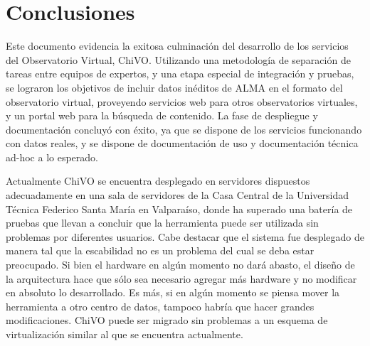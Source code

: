 \section{Conclusiones}

Este documento evidencia la exitosa culminación del desarrollo de los servicios del Observatorio Virtual, ChiVO. Utilizando una metodología de separación de tareas entre equipos de expertos, y una etapa especial de integración y pruebas, se lograron los objetivos de incluir datos inéditos de ALMA en el formato del observatorio virtual, proveyendo servicios web para otros observatorios virtuales, y un portal web para la búsqueda de contenido.  La fase de despliegue y documentación concluyó con éxito, ya que se dispone de los servicios funcionando con datos reales, y se dispone de documentación de uso y documentación técnica ad-hoc a lo esperado.

Actualmente ChiVO se encuentra desplegado en servidores dispuestos adecuadamente en una sala de servidores de la Casa Central de la Universidad T\'ecnica Federico Santa María en Valparaíso, donde ha superado una batería de pruebas que llevan a concluir que la herramienta puede ser utilizada sin problemas por diferentes usuarios. Cabe destacar que el sistema fue desplegado de manera tal que la escabilidad no es un problema del cual se deba estar preocupado. Si bien el hardware en algún momento no dará abasto, el diseño de la arquitectura hace que sólo sea necesario agregar más hardware y no modificar en absoluto lo desarrollado. Es más, si en algún momento se piensa mover la herramienta a otro centro de datos, tampoco habría que hacer grandes modificaciones. ChiVO puede ser migrado sin problemas a un esquema de virtualización similar al que se encuentra actualmente.


